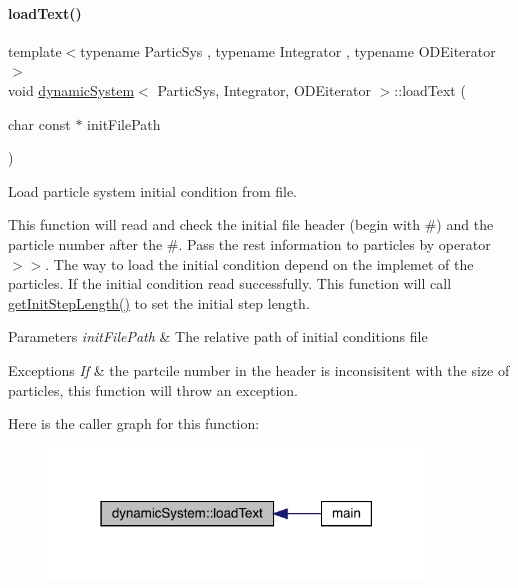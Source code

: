 \paragraph{\texorpdfstring{load\+Text()}{loadText()}}
{\footnotesize\ttfamily template$<$typename Partic\+Sys , typename Integrator , typename O\+D\+Eiterator $>$ \\
void \mbox{\hyperlink{classdynamic_system}{dynamic\+System}}$<$ Partic\+Sys, Integrator, O\+D\+Eiterator $>$\+::load\+Text (\begin{DoxyParamCaption}\item[{char const $\ast$}]{init\+File\+Path }\end{DoxyParamCaption})}



Load particle system initial condition from file. 

This function will read and check the initial file header (begin with \textquotesingle{}\#\textquotesingle{}) and the particle number after the \textquotesingle{}\#\textquotesingle{}. Pass the rest information to particles by operator \textquotesingle{}$>$$>$\textquotesingle{}. The way to load the initial condition depend on the implemet of the particles. If the initial condition read successfully. This function will call \mbox{\hyperlink{classdynamic_system_a9009d61ca09844f016ebc0d87467dba3}{get\+Init\+Step\+Length()}} to set the initial step length.


\begin{DoxyParams}{Parameters}
{\em init\+File\+Path} & The relative path of initial conditions file \\
\hline
\end{DoxyParams}

\begin{DoxyExceptions}{Exceptions}
{\em If} & the partcile number in the header is inconsisitent with the size of particles, this function will throw an exception. \\
\hline
\end{DoxyExceptions}
Here is the caller graph for this function\+:\nopagebreak
\begin{figure}[H]
\begin{center}
\leavevmode
\includegraphics[width=283pt]{classdynamic_system_a44849a58489dd8c300edc920f793c56a_icgraph}
\end{center}
\end{figure}
\mbox{\label{classdynamic_system_af1b1ccfa965c677bd66029b42377117d}} 
